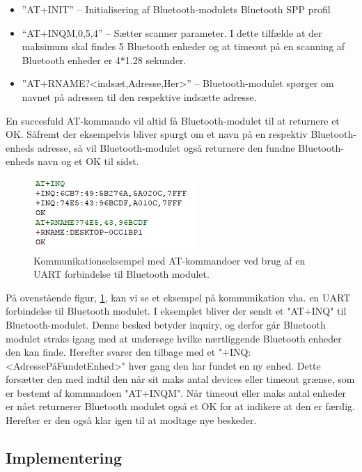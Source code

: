 \begin{itemize}
	\item ”AT+INIT” – Initialisering af Bluetooth-modulets Bluetooth SPP profil
	\item “AT+INQM,0,5,4” – Sætter scanner parameter. I dette tilfælde at der maksimum skal findes 5 Bluetooth enheder og at timeout på en scanning af Bluetooth enheder er 4*1.28 sekunder.
	\item ”AT+RNAME?<indsæt,Adresse,Her>” – Bluetooth-modulet spørger om navnet på adressen til den respektive indsætte adresse.
\end{itemize}

En succesfuld AT-kommando vil altid få Bluetooth-modulet til at returnere et OK. Såfremt der eksempelvis bliver spurgt om et navn på en respektiv Bluetooth-enheds adresse, så vil Bluetooth-modulet også returnere den fundne Bluetooth-enheds navn og et OK til sidst. 

\begin{figure}[H]
	\centering
	\includegraphics[width = 200 pt]{Img/uart_eksempel.PNG}
	\caption{Kommunikationseksempel med AT-kommandoer ved brug af en UART forbindelse til Bluetooth modulet.}
	\label{fig:UART_eksempel}
\end{figure}

På ovenstående figur,  \ref{fig:UART_eksempel}, kan vi se et eksempel på kommunikation vha. en UART forbindelse til Bluetooth modulet. I eksemplet bliver der sendt et "AT+INQ" til Bluetooth-modulet. Denne besked betyder inquiry, og derfor går Bluetooth modulet straks igang med at undersøge hvilke nærtliggende Bluetooth enheder den kan finde. Herefter svarer den tilbage med et "+INQ:<AdressePåFundetEnhed>" hver gang den har fundet en ny enhed. Dette forsætter den med indtil den når sit maks antal devices eller timeout grænse, som er bestemt af kommandoen "AT+INQM". Når timeout eller maks antal enheder er nået returnerer Bluetooth modulet også et OK for at indikere at den er færdig. Herefter er den også klar igen til at modtage nye beskeder.

\subsection{Implementering}

